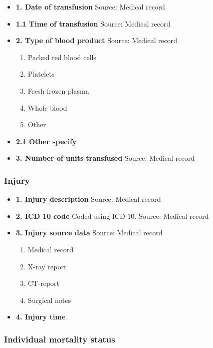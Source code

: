\documentclass[
]{scrartcl}
\providecommand{\tightlist}{%
  \setlength{\itemsep}{0pt}\setlength{\parskip}{0pt}}\usepackage{longtable,booktabs,array}
\begin{document}
\begin{itemize}
\item
  \textbf{1. Date of transfusion} Source: Medical record
\item
  \textbf{1.1 Time of transfusion} Source: Medical record
\item
  \textbf{2. Type of blood product} Source: Medical record

  \begin{enumerate}
  \def\labelenumi{\arabic{enumi}.}
  \tightlist
  \item
    Packed red blood cells
  \item
    Platelets
  \item
    Fresh frozen plasma
  \item
    Whole blood
  \item
    Other
  \end{enumerate}
\item
  \textbf{2.1 Other specify}
\item
  \textbf{3. Number of units transfused} Source: Medical record
\end{itemize}

\hypertarget{injury}{%
\subsubsection{Injury}\label{injury}}

\begin{itemize}
\item
  \textbf{1. Injury description} Source: Medical record
\item
  \textbf{2. ICD 10 code} Coded using ICD 10. Source: Medical record
\item
  \textbf{3. Injury source data} Source: Medical record

  \begin{enumerate}
  \def\labelenumi{\arabic{enumi}.}
  \tightlist
  \item
    Medical record
  \item
    X-ray report
  \item
    CT-report
  \item
    Surgical notes
  \end{enumerate}
\item
  \textbf{4. Injury time}
\end{itemize}

\hypertarget{individual-mortality-status}{%
\subsubsection{Individual mortality
status}\label{individual-mortality-status}}
\end{document}
